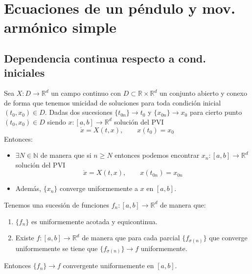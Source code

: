 \documentclass[12pt]{book}
\begin{document}
    \portada[%
        titulo=Ecuaciones Diferenciales,
        subtitulo=,
        autor=Jesús Muñoz Velasco,
        año=Curso 2025-2026]
        
    \thispagestyle{empty}
    \tableofcontents
    \newpage
    \thispagestyle{empty}

    \setcounter{chapter}{2}

\chapter{Ecuaciones de un péndulo y mov. armónico simple}

\section{Dependencia continua respecto a cond. iniciales}

\begin{teo}\label{teo:dep_cont}
    Sea $X:D\to \mathbb{R}^d$ un campo continuo con $D\subset \mathbb{R}\times \mathbb{R}^d$ un conjunto abierto y conexo de forma que tenemos unicidad de soluciones para toda condición inicial $(t_0,x_0)\in D$. Dadas dos sucesiones $\{t_{0n}\}\to t_0$ y $\{x_{0n}\}\to x_0$ para cierto punto $(t_0,x_0)\in D$ siendo $x:[a,b]\to \mathbb{R}^d$ solución del PVI
    \begin{equation*}
        \dot{x} = X(t,x), \qquad x(t_0) = x_0
    \end{equation*}
    Entonces:
    \begin{itemize}
        \item $\exists N\in \mathbb{N}$ de manera que si $n\geq N$ entonces podemos encontrar $x_n:[a,b]\to \mathbb{R}^d$ solución del PVI
            \begin{equation*}
                \dot{x} = X(t,x), \qquad x(t_{0n}) = x_{0n}
            \end{equation*}
        \item Además, $\{x_n\}$ converge uniformemente a $x$ en $[a,b]$.
    \end{itemize}
\end{teo}


\begin{lema}\label{lema:Ascoli}
    Tenemos una sucesión de funciones $f_n:[a,b]\to \mathbb{R}^d$ de manera que:
    \begin{enumerate}
        \item $\{f_n\}$ es uniformemente acotada y equicontinua.
        \item Existe $f:[a,b]\to \mathbb{R}^d$ de manera que para cada parcial $\{f_{\sigma(n)}\}$ que converge uniformemente se tiene que $\{f_{\sigma(n)}\}\to f$ uniformemente.
    \end{enumerate}
    Entonces $\{f_n\}\to f$ convergente uniformemente en $[a,b]$.
\end{lema}
\end{document}
